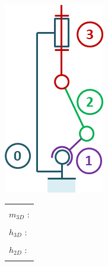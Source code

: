 \documentclass[10pt,fleqn]{article} %
\begin{document}
\begin{multicols}{2}
\begin{minipage}[c]{.45\linewidth}
\begin{center}
\includegraphics[width=.8\linewidth]{images/cas_03.png}
\end{center}
\end{minipage} \hfill
\begin{minipage}[c]{.5\linewidth}
\begin{center}
\begin{tabular}{|p{3cm}|}
\hline 
\\
$m_{3D}$ : \\
\\
$h_{3D}$ : \\
\\
$h_{2D}$ : \\
\\
\hline
\end{tabular}
\end{center}
\end{minipage}



\end{multicols}
\end{document}
